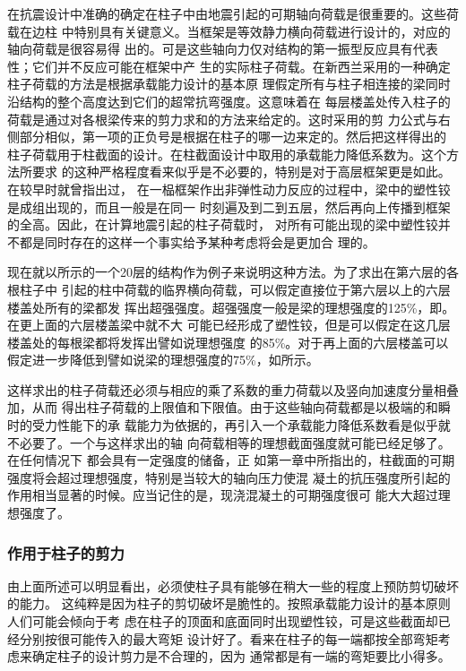 \documentclass[12pt,a4paper]{book}
\begin{document}
在抗震设计中准确的确定在柱子中由地震引起的可期轴向荷载是很重要的。这些荷载在边柱
中特别具有关键意义。当框架是等效静力横向荷载进行设计的，对应的轴向荷载是很容易得
出的。可是这些轴向力仅对结构的第一振型反应具有代表性；它们并不反应可能在框架中产
生的实际柱子荷载。在新西兰采用的一种确定柱子荷载的方法是根据承载能力设计的基本原
理假定所有与柱子相连接的梁同时沿结构的整个高度达到它们的超常抗弯强度。这意味着在
每层楼盖处传入柱子的荷载是通过对各根梁传来的剪力求和的方法来给定的。这时采用的剪
力公式与右侧部分相似，第一项的正负号是根据在柱子的哪一边来定的。然后把这样得出的
柱子荷载用于柱截面的设计。在柱截面设计中取用的承载能力降低系数为。这个方法所要求
的这种严格程度看来似乎是不必要的，特别是对于高层框架更是如此。在较早时就曾指出过，
在一榀框架作出非弹性动力反应的过程中，梁中的塑性铰是成组出现的，而且一般是在同一
时刻遍及到二到五层，然后再向上传播到框架的全高。因此，在计算地震引起的柱子荷载时，
对所有可能出现的梁中塑性铰并不都是同时存在的这样一个事实给予某种考虑将会是更加合
理的。

现在就以所示的一个20层的结构作为例子来说明这种方法。为了求出在第六层的各根柱子中
引起的柱中荷载的临界横向荷载，可以假定直接位于第六层以上的六层楼盖处所有的梁都发
挥出超强强度。超强强度一般是梁的理想强度的125\%，即。在更上面的六层楼盖梁中就不大
可能已经形成了塑性铰，但是可以假定在这几层楼盖处的每根梁都将发挥出譬如说理想强度
的85\%。对于再上面的六层楼盖可以假定进一步降低到譬如说梁的理想强度的75\%，如所示。

这样求出的柱子荷载还必须与相应的乘了系数的重力荷载以及竖向加速度分量相叠加，从而
得出柱子荷载的上限值和下限值。由于这些轴向荷载都是以极端的和瞬时的受力性能下的承
载能力为依据的，再引入一个承载能力降低系数看是似乎就不必要了。一个与这样求出的轴
向荷载相等的理想截面强度就可能已经足够了。在任何情况下 都会具有一定强度的储备，正
如第一章中所指出的，柱截面的可期强度将会超过理想强度，特别是当较大的轴向压力使混
凝土的抗压强度所引起的作用相当显著的时候。应当记住的是，现浇混凝土的可期强度很可
能大大超过理想强度了。

\subsubsection{作用于柱子的剪力}

由上面所述可以明显看出，必须使柱子具有能够在稍大一些的程度上预防剪切破坏的能力。
这纯粹是因为柱子的剪切破坏是脆性的。按照承载能力设计的基本原则人们可能会倾向于考
虑在柱子的顶面和底面同时出现塑性铰，可是这些截面却已经分别按很可能传入的最大弯矩
设计好了。看来在柱子的每一端都按全部弯矩考虑来确定柱子的设计剪力是不合理的，因为
通常都是有一端的弯矩要比小得多。
\end{document}
